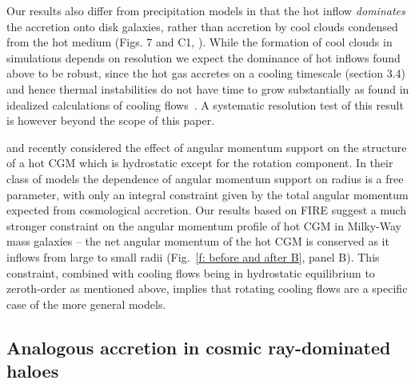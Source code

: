 \documentclass[fleqn,usenatbib]{mnras}
\begin{document}
Our results also differ from precipitation models in that the hot inflow \textit{dominates} the accretion onto disk galaxies, rather than accretion by cool clouds condensed from the hot medium (Figs. 7 and C1, \citealt{Esmerian2021}).
While the formation of cool clouds in simulations depends on resolution \citep[e.g.][]{McCourt2018, Mandelker2019a,Mandelker2021, Gronke2020b, Fielding2020} we expect the dominance of hot inflows found above to be robust, since the hot gas accretes on a cooling timescale (section 3.4) and hence thermal instabilities do not have time to grow substantially as found in idealized calculations of cooling flows~\citep{Balbus1989,Stern2019}.
A systematic resolution test of this result is however beyond the scope of this paper. 

\cite{Pezzulli2017} and \cite{Sormani2018} recently considered the effect of angular momentum support on the structure of a hot CGM which is hydrostatic except for the rotation component.
In their class of models the dependence of angular momentum support on radius is a free parameter, with only an integral constraint given by the total angular momentum expected from  cosmological accretion.
Our results based on FIRE suggest a much stronger constraint on the angular momentum profile of hot CGM in Milky-Way mass galaxies -- the net angular momentum of the hot CGM is conserved as it inflows from large to small radii (Fig.~\ref{f: before and after B}, panel B). 
This constraint, combined with cooling flows being in hydrostatic equilibrium to zeroth-order as mentioned above, implies that rotating cooling flows are a specific case of the more general \cite{Sormani2018} models. 



\subsection{Analogous accretion in cosmic ray-dominated haloes}
\label{s: crs}
\end{document}
